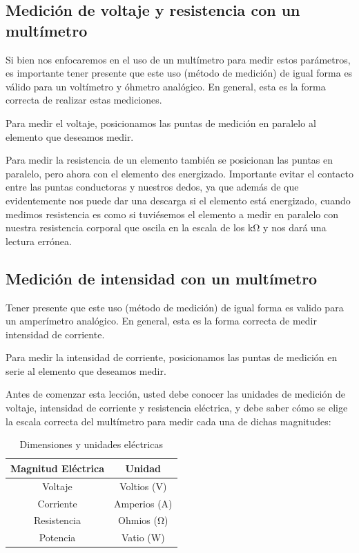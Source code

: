 \documentclass{article}
\begin{document}
    \subsection*{Medición de voltaje y resistencia con un multímetro}
    Si bien nos enfocaremos en el uso de un multímetro para medir estos parámetros, es importante tener presente que este uso (método de medición) de igual forma es válido para un voltímetro y óhmetro analógico. En general, esta es la forma correcta de realizar estas mediciones.

    Para medir el voltaje, posicionamos las puntas de medición en paralelo al elemento que deseamos medir.


    Para medir la resistencia de un elemento también se posicionan las puntas en paralelo, pero ahora con el elemento des energizado. Importante evitar el contacto entre las puntas conductoras y nuestros dedos, ya que además de que evidentemente nos puede dar una descarga si el elemento está energizado, cuando medimos resistencia es como si tuviésemos el elemento a medir en paralelo con nuestra resistencia corporal que oscila en la escala de los \unit{\kilo\ohm} y nos dará una lectura errónea.

    \subsection*{Medición de intensidad con un multímetro}
    Tener presente que este uso (método de medición) de igual forma es valido para un amperímetro analógico. En general, esta es la forma correcta de medir intensidad de corriente.

    Para medir la intensidad de corriente, posicionamos las puntas de medición en serie al elemento que deseamos medir.


    Antes de comenzar esta lección, usted debe conocer las unidades de medición de voltaje, intensidad de corriente y resistencia eléctrica, y debe saber cómo se elige la escala correcta del multímetro para medir cada una de dichas magnitudes:

    \begin{table}[ht]
        \centering
        \begin{tabular}{|c|c|} %
            \midrule
            Magnitud Eléctrica & Unidad \\
            \midrule
            Voltaje     & Voltios (\unit{\volt}) \\
            Corriente   & Amperios (\unit{\ampere}) \\
            Resistencia & Ohmios (\unit{\ohm}) \\
            Potencia    & Vatio (\unit{\watt}) \\
            \midrule
        \end{tabular}
        \caption{Dimensiones y unidades eléctricas}
    \end{table}
\end{document}
